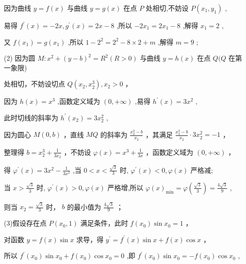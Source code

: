 \documentclass[10pt]{article}
\begin{document}
因为曲线 \(y = f\left( x\right)\) 与曲线 \(y = g\left( x\right)\) 在点 \(P\) 处相切,不妨设 \(P\left( {{x}_{1},{y}_{1}}\right)\) ,

易得 \({f}^{\prime }\left( x\right)  =  - {2x},{g}^{\prime }\left( x\right)  = {2x} - 8\) ,所以 \(- 2{x}_{1} = 2{x}_{1} - 8\) ,解得 \({x}_{1} = 2\) ,

又 \(f\left( {x}_{1}\right)  = g\left( {x}_{1}\right)\) ,所以 \(1 - {2}^{2} = {2}^{2} - 8 \times  2 + m\) ,解得 \(m = 9\) ;

(2) 因为圆 \(M : {x}^{2} + {\left( y - b\right) }^{2} = {R}^{2}\left( {R > 0}\right)\) 与曲线 \(y = h\left( x\right)\) 在点 \(Q(Q\) 在第一象限)

处相切，不妨设切点 \(Q\left( {{x}_{2},{x}_{2}^{3}}\right) ,{x}_{2} > 0\) ，

因为 \(h\left( x\right)  = {x}^{3}\) ,函数定义域为 \(\left( {0, + \infty }\right)\) ,易得 \({h}^{\prime }\left( x\right)  = 3{x}^{2}\) ,

此时切线的斜率为 \({h}^{\prime }\left( {x}_{2}\right)  = 3{x}_{2}^{2}\) ,

因为圆心 \(M\left( {0,b}\right)\) ，直线 \({MQ}\) 的斜率为 \(\frac{{x}_{2}^{3} - b}{{x}_{2}}\) ，其满足 \(\frac{{x}_{2}^{3} - b}{{x}_{2}} \cdot  {3{x}_{2}^{2}} =  - 1\) ，

整理得 \(b = {x}_{2}^{3} + \frac{1}{3{x}_{2}}\) ，不妨设 \(\varphi \left( x\right)  = {x}^{3} + \frac{1}{3x}\) ，函数定义域为 \(\left( {0, + \infty }\right)\) ，

得 \({\varphi }^{\prime }\left( x\right)  = 3{x}^{2} - \frac{1}{3{x}^{2}}\) ,当 \(0 < x < \frac{\sqrt{3}}{3}\) 时, \({\varphi }^{\prime }\left( x\right)  < 0,\varphi \left( x\right)\) 严格减;

当 \(x > \frac{\sqrt{3}}{3}\) 时, \({\varphi }^{\prime }\left( x\right)  > 0,\varphi \left( x\right)\) 严格增,所以 \(\varphi {\left( x\right) }_{\min } = \varphi \left( \frac{\sqrt{3}}{3}\right)  = \frac{4\sqrt{3}}{9}\) ,

则当 \({x}_{2} = \frac{\sqrt{3}}{3}\) 时， \(b\) 的最小值为 \(\frac{4\sqrt{3}}{9}\) ；

(3)假设存在点 \(P\left( {{x}_{0},1}\right)\) 满足条件，此时 \(f\left( {x}_{0}\right) \sin {x}_{0} = 1\) ，

对函数 \(y = f\left( x\right) \sin x\) 求导，得 \({y}^{\prime } = {f}^{\prime }\left( x\right) \sin x + f\left( x\right) \cos x\) ，

所以 \({f}^{\prime }\left( {x}_{0}\right) \sin {x}_{0} + f\left( {x}_{0}\right) \cos {x}_{0} = 0\) ,即 \({f}^{\prime }\left( {x}_{0}\right) \sin {x}_{0} =  - f\left( {x}_{0}\right) \cos {x}_{0}\) ,
\end{document}

